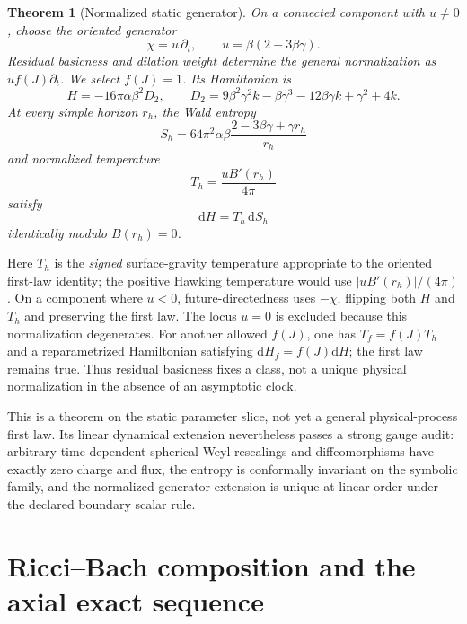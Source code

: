 \documentclass[11pt]{article}
\newtheorem{theorem}{Theorem}[section]
\theoremstyle{definition}
\theoremstyle{remark}
\newcommand{\dd}{\mathrm d}
\begin{document}
\begin{theorem}[Normalized static generator]
On a connected component with \(u\neq0\), choose the oriented generator
\begin{equation}
 \chi=u\,\partial_t,
 \qquad u=\beta(2-3\beta\gamma).
\end{equation}
Residual basicness and dilation weight determine the general normalization
as \(u f(J)\partial_t\).  We select \(f(J)=1\).  Its Hamiltonian is
\begin{equation}
 H=-16\pi\alpha\beta^2D_2,
 \qquad
 D_2=9\beta^2\gamma^2k-\beta\gamma^3
     -12\beta\gamma k+\gamma^2+4k.
\end{equation}
At every simple horizon \(r_h\), the Wald entropy
\begin{equation}
 S_h=64\pi^2\alpha\beta
 \frac{2-3\beta\gamma+\gamma r_h}{r_h}
\end{equation}
and normalized temperature
\begin{equation}
 T_h=\frac{uB'(r_h)}{4\pi}
\end{equation}
satisfy
\begin{equation}
 \dd H=T_h\,\dd S_h
\end{equation}
identically modulo \(B(r_h)=0\).
\end{theorem}

Here \(T_h\) is the \emph{signed} surface-gravity temperature appropriate to
the oriented first-law identity; the positive Hawking temperature would use
\(|uB'(r_h)|/(4\pi)\).  On a component where \(u<0\), future-directedness
uses \(-\chi\), flipping both \(H\) and \(T_h\) and preserving the first
law.  The locus \(u=0\) is excluded because this normalization degenerates.
For another allowed \(f(J)\), one has \(T_f=f(J)T_h\) and a reparametrized
Hamiltonian satisfying \(\dd H_f=f(J)\dd H\); the first law remains true.
Thus residual basicness fixes a class, not a unique physical normalization
in the absence of an asymptotic clock.

This is a theorem on the static parameter slice, not yet a general
physical-process first law.  Its linear dynamical extension nevertheless
passes a strong gauge audit: arbitrary time-dependent spherical Weyl
rescalings and diffeomorphisms have exactly zero charge and flux, the entropy
is conformally invariant on the symbolic family, and the normalized
generator extension is unique at linear order under the declared boundary
scalar rule.

\section{Ricci--Bach composition and the axial exact sequence}
\end{document}
